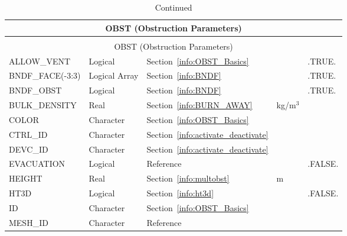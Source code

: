 \documentclass[11pt]{book}
\begin{document}
\begin{longtable}{@{\extracolsep{\fill}}|l|l|l|l|l|}
\caption[Obstruction parameters ({\ct OBST} namelist group)]{For more information see Section~\ref{info:OBST}.}
\label{tbl:OBST} \\
\hline
\multicolumn{5}{|c|}{{\ct OBST} (Obstruction Parameters)} \\
\hline \hline
\endfirsthead
\caption[]{Continued} \\
\hline
\multicolumn{5}{|c|}{{\ct OBST} (Obstruction Parameters)} \\
\hline \hline
\endhead
{\ct ALLOW\_VENT}         & Logical             & Section~\ref{info:OBST_Basics}            &           & {\ct .TRUE.}  \\ \hline
{\ct BNDF\_FACE(-3:3)}    & Logical Array       & Section~\ref{info:BNDF}                   &           & {\ct .TRUE.}  \\ \hline
{\ct BNDF\_OBST}          & Logical             & Section~\ref{info:BNDF}                   &           & {\ct .TRUE.}  \\ \hline
{\ct BULK\_DENSITY}       & Real                & Section~\ref{info:BURN_AWAY}              & kg/m$^3$  &               \\ \hline
{\ct COLOR    }           & Character           & Section~\ref{info:OBST_Basics}            &           &               \\ \hline
{\ct CTRL\_ID }           & Character           & Section~\ref{info:activate_deactivate}    &           &               \\ \hline
{\ct DEVC\_ID }           & Character           & Section~\ref{info:activate_deactivate}    &           &               \\ \hline
{\ct EVACUATION}          & Logical             & Reference~\cite{FDS_Evac_Users_Guide}     &           & {\ct .FALSE.} \\ \hline
{\ct HEIGHT}              & Real                & Section~\ref{info:multobst}               & m         &               \\ \hline
{\ct HT3D}                & Logical             & Section~\ref{info:ht3d}                   &           & {\ct .FALSE.} \\ \hline
{\ct ID }                 & Character           & Section~\ref{info:OBST_Basics}            &           &               \\ \hline
{\ct MESH\_ID}            & Character           & Reference~\cite{FDS_Evac_Users_Guide}     &           &               \\ \hline

\end{longtable}
\end{document}
